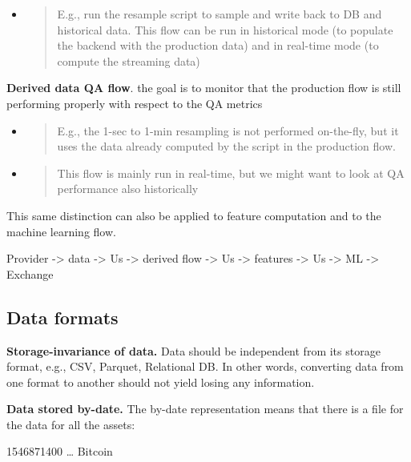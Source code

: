 \documentclass[11pt, reqno]{amsart}
\begin{document}
\begin{itemize}
\item
  \begin{quote}
  E.g., run the resample script to sample and write back to DB and
  historical data. This flow can be run in historical mode (to populate
  the backend with the production data) and in real-time mode (to
  compute the streaming data)
  \end{quote}
\end{itemize}

\textbf{Derived data QA flow}. the goal is to monitor that the
production flow is still performing properly with respect to the QA
metrics

\begin{itemize}
\item
  \begin{quote}
  E.g., the 1-sec to 1-min resampling is not performed on-the-fly, but
  it uses the data already computed by the script in the production
  flow.
  \end{quote}
\item
  \begin{quote}
  This flow is mainly run in real-time, but we might want to look at QA
  performance also historically
  \end{quote}
\end{itemize}

This same distinction can also be applied to feature computation and to
the machine learning flow.

Provider -\textgreater{} data -\textgreater{} Us -\textgreater{} derived
flow -\textgreater{} Us -\textgreater{} features -\textgreater{} Us
-\textgreater{} ML -\textgreater{} Exchange

\subsection{Data formats}

\textbf{Storage-invariance of data.} Data should be independent from its
storage format, e.g., CSV, Parquet, Relational DB. In other words,
converting data from one format to another should not yield losing any
information.

\textbf{Data stored by-date.} The by-date representation means that
there is a file for the data for all the assets:

1546871400 \ldots{} Bitcoin
\end{document}
